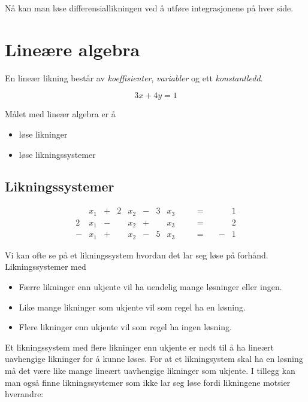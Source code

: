 \documentclass[12pt,norsk,a4paper]{article}
\begin{document}
Nå kan man løse differensiallikningen ved å utføre integrasjonene på hver side.












\newpage
\section{Lineære algebra}
En lineær likning består av \textit{koeffisienter}, \textit{variabler} og ett \textit{konstantledd}.

\begin{equation*}
3x + 4y = 1
\end{equation*}

Målet med lineær algebra er å

\begin{itemize}
\item løse likninger
\item løse likningssystemer
\end{itemize}

\subsection{Likningssystemer}

\begin{equation*}
\begin{alignedat}{10}
	&x_{1}	&+	&	2	&x_{2}	&-	&	3	&x_{3}	&	\quad	&=	\quad	&		&1	\\
2	&x_{1}	&-	&		&x_{2}	&+	&		&x_{3}	&	\quad	&=	\quad	&		&2	\\
-	&x_{1}	&+	&		&x_{2}	&-	&	5	&x_{3}	&	\quad	&=	\quad	&	-	&1
\end{alignedat}
\end{equation*}

Vi kan ofte se på et likningssystem hvordan det lar seg løse på forhånd. Likningssystemer med

\begin{itemize}
\item Færre likninger enn ukjente vil ha uendelig mange løsninger eller ingen.
\item Like mange likninger som ukjente vil som regel ha en løsning.
\item Flere likninger enn ukjente vil som regel ha ingen løsning.
\end{itemize}

Et likningssystem med flere likninger enn ukjente er nødt til å ha lineært uavhengige likninger for å kunne løses. For at et likningsystem skal ha en løsning må det være like mange lineært uavhengige likninger som ukjente. I tillegg kan man også finne likningssystemer som ikke lar seg løse fordi likningene motsier hverandre:
\end{document}
